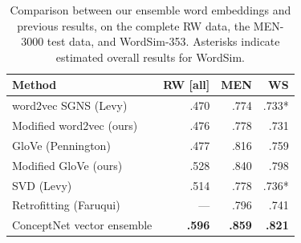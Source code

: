 \documentclass[11pt,letterpaper]{article}
\begin{document}
\begin{table}[t]
\centering
\footnotesize
\begin{tabular}{l|rrr}
\toprule
Method                        & RW [all]  &      MEN  & WS    \\
\midrule
word2vec SGNS (Levy)          &     .470  &     .774  & .733* \\
Modified word2vec (ours)      &     .476  &     .778  & .731  \\
GloVe (Pennington)            &     .477  &     .816  & .759  \\
Modified GloVe (ours)         &     .528  &     .840  & .798  \\
SVD (Levy)                    &     .514  &     .778  & .736* \\
Retrofitting (Faruqui)        &      ---  &     .796  & .741  \\
ConceptNet vector ensemble    & \bf .596  & \bf .859  & \bf .821 \\
\bottomrule
\end{tabular}

\caption{
    Comparison between our ensemble word embeddings and previous results,
    on the complete RW data, the MEN-3000 test data, and WordSim-353.
    Asterisks indicate estimated overall results for WordSim.
}
\label{compare-others}
\end{table}
\end{document}
